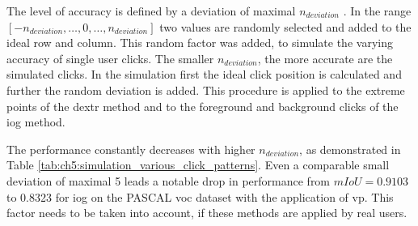 The level of accuracy is defined by a deviation of maximal $ n_{deviation} $ .
In the range $ \left[-n_{deviation}, \dots, 0, \dots, n_{deviation} \right] $ two values are randomly selected and added to the ideal row and column.
This random factor was added, to simulate the varying accuracy of single user clicks.
The smaller $ n_{deviation} $, the more accurate are the simulated clicks.
In the simulation first the ideal click position is calculated and further the random deviation is added.
This procedure is applied to the extreme points of the \gls{dextr} method and to the foreground and background clicks of the \gls{iog} method.
\begin{table}[h!]
	\centering	
	\caption[Simulations with different click patterns]{
		Simulations of the \gls{dextr} and \gls{iog} method with user clicks, that are simulated with varying degrees of accuracy.
		The parameter $ n_{deviation} $ states the maximal possible deviation from the optimal point, in order to mimic different types of users.
		As expected, the performance decreases with increasing deviation in the simulated user clicks.
	}\label{tab:ch5:simulation_various_click_patterns}
\end{table}

The performance constantly decreases with higher $ n_{deviation} $, as demonstrated in Table \ref{tab:ch5:simulation_various_click_patterns}. 
Even a comparable small deviation of maximal 5  leads a notable drop in performance \eg from $ mIoU = 0.9103 $ to 0.8323 for \gls{iog} on the PASCAL \gls{voc} dataset with the application of \gls{vp}.
This factor needs to be taken into account, if these methods are applied by real users.




